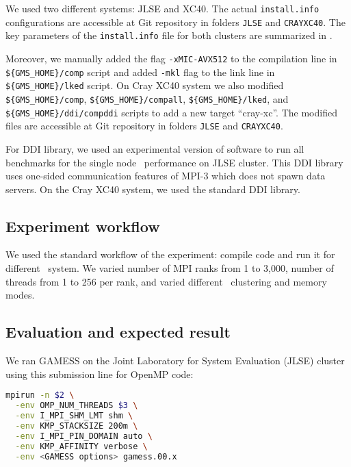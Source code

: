 We used two different \intelphireg systems: JLSE and XC40. The actual \texttt{install.info} configurations are accessible at Git repository in folders \texttt{JLSE} and \texttt{CRAYXC40}.  The key parameters of the \texttt{install.info} file for both clusters are summarized in .

Moreover, we manually added the flag \texttt{-xMIC-AVX512} to the compilation line in \texttt{\$\{GMS\_HOME\}/comp} script and added \texttt{-mkl} flag to the link line in \texttt{\$\{GMS\_HOME\}/lked} script. On Cray XC40 system we also modified \texttt{\$\{GMS\_HOME\}/comp}, \texttt{\$\{GMS\_HOME\}/compall}, \texttt{\$\{GMS\_HOME\}/lked}, and \texttt{\$\{GMS\_HOME\}/ddi/compddi} scripts to add a new target ``cray-xc''. The modified files are accessible at Git repository in folders \texttt{JLSE} and \texttt{CRAYXC40}.

For DDI library, we used an experimental version of software to run all benchmarks for the single node \intelphireg\ performance on JLSE cluster. This DDI library uses one-sided communication features of MPI-3 which does not spawn data servers. On the Cray XC40 system, we used the standard DDI library.


\subsection{Experiment workflow}

We used the standard workflow of the experiment: compile code and run it for different \intelphireg\ system. We varied number of MPI ranks from 1 to 3,000, number of threads from 1 to 256 per rank, and varied different \iphireg\ clustering and memory modes.

\subsection{Evaluation and expected result}

We ran GAMESS on the Joint Laboratory for System Evaluation (JLSE) cluster using this submission line for OpenMP code:
\begin{lstlisting}[language=bash]
mpirun -n $2 \
  -env OMP_NUM_THREADS $3 \
  -env I_MPI_SHM_LMT shm \
  -env KMP_STACKSIZE 200m \
  -env I_MPI_PIN_DOMAIN auto \
  -env KMP_AFFINITY verbose \
  -env <GAMESS options> gamess.00.x
\end{lstlisting}

